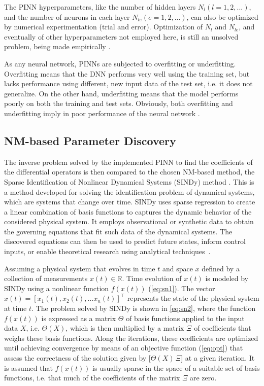 The PINN hyperparameters, like the number of hidden layers $N_l(l = 1, 2, ...)$, and the number of neurons in each layer $N_{le}(e = 1, 2, ...)$, can also be optimized by numerical experimentation (trial and error). Optimization of $N_l$ and $N_{le}$, and eventually of other hyperparameters not employed here, is still an unsolved problem, being made empirically \cite{Xu2022}.

As any neural network, PINNs are subjected to overfitting or underfitting. Overfitting means that the DNN performs very well using the training set, but lacks performance using different, new input data of the test set, i.e. it does not generalize. On the other hand, underfitting means that the model performs poorly on both the training and test sets. Obviously, both overfitting and underfitting imply in poor performance of the neural network \cite{Koehrsen2018}.

\subsection{NM-based Parameter Discovery}
\label{sec:npd}

The inverse problem solved by the implemented PINN to find the coefficients of the differential operators is then compared to the chosen NM-based method, the Sparse Identification of Nonlinear Dynamical Systems (SINDy) method \cite{Boninsegna2018}. This is a method developed for solving the identification problem of dynamical systems, which are systems that change over time. SINDy uses sparse regression to create a linear combination of basis functions to captures the dynamic behavior of the considered physical system. It employs observational or synthetic data to obtain the governing equations that fit such data of the dynamical systems. The discovered equations can then be used to predict future states, inform control inputs, or enable theoretical research using analytical techniques~\cite{Brunton2016}.

Assuming a physical system that evolves in time $t$ and space $x$ defined by a collection of measurements $x(t)\in \mathbb{R}$. Time evolution of $x(t)$ is modeled by SINDy using a nonlinear function $f(x(t))$ (\autoref{eq:sn1}). The vector $x(t)=[x_1(t), x_2(t), \dots x_n(t)]^\top$ represents the state of the physical system at time $t$. The problem solved by SINDy is shown in \autoref{eq:sn2}, where the function $f(x(t))$ is expressed as a matrix $\Theta$ of basis functions applied to the input data $X$, i.e. $\Theta(X)$, which is then multiplied by a matrix $\Xi$ of coefficients that weighs these basis functions. Along the iterations, these coefficients are optimized until achieving convergence by means of an objective function (\autoref{eq:opt}) that assess the correctness of the solution given by [$\Theta(X)\,\Xi$] at a given iteration. It is assumed that $f(x(t))$ is usually sparse in the space of a suitable set of basis functions, i.e. that much of the coefficients of the matrix $\Xi$ are zero. 

